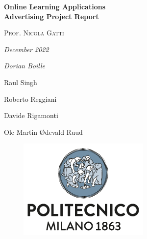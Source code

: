 

\begin{titlepage}
    \centering
    \vspace*{2em}
    
    {\Huge\bfseries Online Learning Applications \\ Advertising Project Report \par}
    
    \vspace{4em}
    
    {\large\scshape Prof. Nicola Gatti \par} 
    
    \vspace{3em}
    
    {\large\slshape December 2022 \par}
    
    \vspace{3em}
    
    {
        \large\itshape 
        Dorian Boille
        \par
        Raul Singh
        \par
        Roberto Reggiani
        \par
        Davide Rigamonti
        \par
        Ole Martin Ødevald Ruud
        \par
    }
    
    \vfill
    
    \begin{figure}[b]
        \includegraphics[scale=0.6]{img/polimi.png} 
        \centering
    \end{figure}
\end{titlepage}

